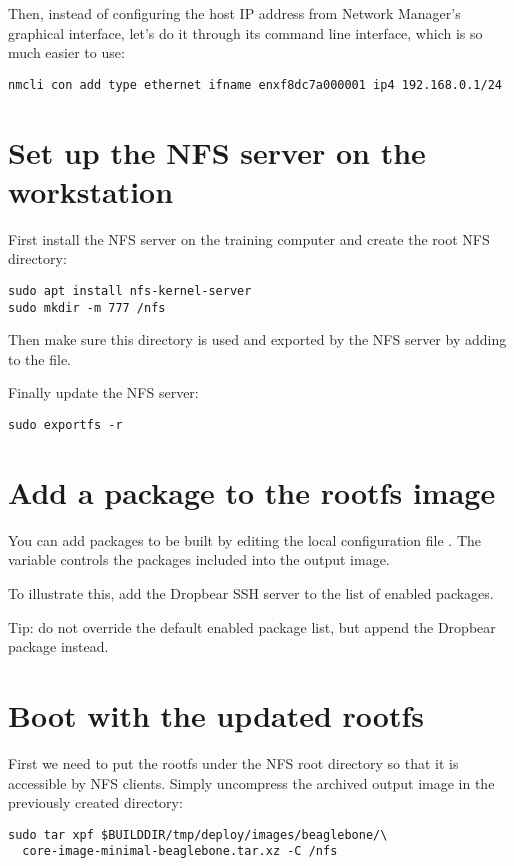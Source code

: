 Then, instead of configuring the host IP address from Network
Manager's graphical interface, let's do it through its command line
interface, which is so much easier to use:

\begin{verbatim}
nmcli con add type ethernet ifname enxf8dc7a000001 ip4 192.168.0.1/24
\end{verbatim}

\section{Set up the NFS server on the workstation}

First install the NFS server on the training computer and create the root NFS
directory:
\begin{verbatim}
sudo apt install nfs-kernel-server
sudo mkdir -m 777 /nfs
\end{verbatim}

Then make sure this directory is used and exported by the NFS server by adding
 to the
 file.

Finally update the NFS server:
\begin{verbatim}
sudo exportfs -r
\end{verbatim}

\section{Add a package to the rootfs image}

You can add packages to be built by editing the local configuration file
. The  variable controls the
packages included into the output image.

To illustrate this, add the Dropbear SSH server to the list of enabled
packages.

Tip: do not override the default enabled package list, but append the Dropbear
package instead.

\section{Boot with the updated rootfs}

First we need to put the rootfs under the NFS root directory so that it is
accessible by NFS clients. Simply uncompress the archived output image in the
previously created  directory:
\begin{verbatim}
sudo tar xpf $BUILDDIR/tmp/deploy/images/beaglebone/\
  core-image-minimal-beaglebone.tar.xz -C /nfs
\end{verbatim}

